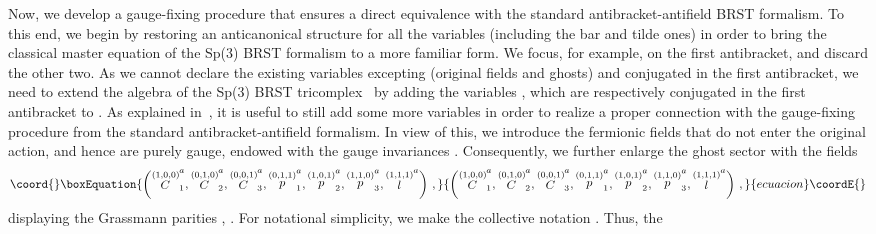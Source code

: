 \documentclass[a4paper,10pt]{article}
\begin{document}
Now, we develop a gauge-fixing procedure that ensures a direct equivalence
with the standard antibracket-antifield BRST formalism. To this end, we
begin by restoring an anticanonical structure for all the variables
(including the bar and tilde ones) in order to bring the classical master
equation of the Sp(3) BRST formalism to a more familiar form. We focus, for
example, on the first antibracket, and discard the other two. As we cannot
declare the existing variables excepting \coordHE{} (original fields and
ghosts) and \coordHE{} conjugated in the first antibracket, we need
to extend the algebra of the Sp(3) BRST tricomplex~\cite{sp3gen} by adding
the variables \coordHE{}, which are respectively
conjugated in the first antibracket to \coordHE{}. As explained in~\cite{sp3gen}, it is useful to
still add some more variables in order to realize a proper connection with
the gauge-fixing procedure from the standard antibracket-antifield
formalism. In view of this, we introduce the fermionic fields \coordHE{} that do not enter the original action, and hence are
purely gauge, endowed with the gauge invariances \coordHE{}. Consequently, we further enlarge the ghost sector with the
fields 
\begin{equation}\coord{}\boxEquation{
\label{sp3.120}
\left( \stackrel{(1,0,0)}{C}_{1}^{a},\stackrel{(0,1,0)}{C}_{2}^{a},\stackrel{
(0,0,1)}{C}_{3}^{a},\stackrel{(0,1,1)}{p}_{1}^{a},\stackrel{(1,0,1)}{p}
_{2}^{a},\stackrel{(1,1,0)}{p}_{3}^{a},\stackrel{(1,1,1)}{l}^{a}\right) \,,
}{
\left( \stackrel{(1,0,0)}{C}_{1}^{a},\stackrel{(0,1,0)}{C}_{2}^{a},\stackrel{
(0,0,1)}{C}_{3}^{a},\stackrel{(0,1,1)}{p}_{1}^{a},\stackrel{(1,0,1)}{p}
_{2}^{a},\stackrel{(1,1,0)}{p}_{3}^{a},\stackrel{(1,1,1)}{l}^{a}\right) \,,
}{ecuacion}\coordE{}\end{equation}
displaying the Grassmann parities \coordHE{}, \coordHE{}. For notational simplicity, we make the collective notation \coordHE{}. Thus, the
\end{document}
